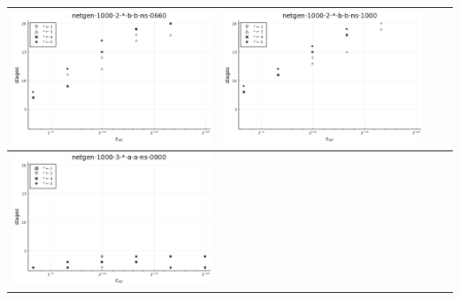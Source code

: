\documentclass{article}
\begin{document}
\begin{landscape}
\begin{center}
\begin{longtable}{| c | c | c | c |}
\includegraphics[height=0.22\textheight]{hiter_fixlim_netgen-1000-2-_-b-b-ns-0660.png} &
\includegraphics[height=0.22\textheight]{hiter_fixlim_netgen-1000-2-_-b-b-ns-1000.png} \\
                \hline
\includegraphics[height=0.22\textheight]{hiter_fixlim_netgen-1000-3-_-a-a-ns-0000.png} &

\end{longtable}
\end{center}
\end{landscape}
\end{document}

